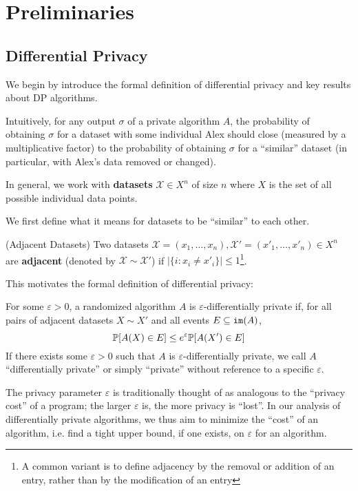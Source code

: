 
\section{Preliminaries}

\subsection{Differential Privacy}

We begin by introduce the formal definition of differential privacy and key results about DP algorithms. 

Intuitively, for any output $\sigma$ of a private algorithm $A$, the probability of obtaining $\sigma$ for a dataset with some individual Alex should close (measured by a multiplicative factor) to the probability of obtaining $\sigma$ for a ``similar'' dataset (in particular, with Alex's data removed or changed).

In general, we work with \textbf{datasets} $\mathcal{X}\in X^n$ of size $n$ where $X$ is the set of all possible individual data points.

We first define what it means for datasets to be ``similar'' to each other. 

\begin{defn}(Adjacent Datasets)
    Two datasets $\mathcal{X}=(x_1, \ldots, x_n), \mathcal{X}'=(x'_1, \ldots, x'_n)\in X^n$ are \textbf{adjacent} (denoted by $\mathcal{X}\sim\mathcal{X}'$) if $|\{i: x_i\neq x'_i\}|\leq 1$\footnote{A common variant is to define adjacency by the removal or addition of an entry, rather than by the modification of an entry}.
\end{defn}

This motivates the formal definition of differential privacy:

\begin{defn}
    For some $\varepsilon>0$, a randomized algorithm $A$ is $\varepsilon$-differentially private if, for all pairs of adjacent datasets $X\sim X'$ and all events $E \subseteq \texttt{im}(A)$, \[\mathbb{P}[A(X) \in E]\leq e^\varepsilon \mathbb{P}[A(X')\in E]\]
    If there exists some $\varepsilon>0$ such that $A$ is $\varepsilon$-differentially private, we call $A$ ``differentially private'' or simply ``private'' without reference to a specific $\varepsilon$.
\end{defn}

The privacy parameter $\varepsilon$ is traditionally thought of as analogous to the ``privacy cost'' of a program; the larger $\varepsilon$ is, the more privacy is ``lost''. In our analysis of differentially private algorithms, we thus aim to minimize the ``cost'' of an algorithm, i.e. find a tight upper bound, if one exists, on $\varepsilon$ for an algorithm. 

